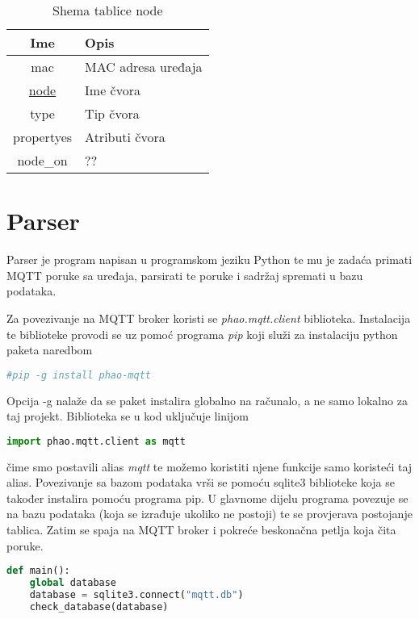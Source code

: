 \documentclass[times, utf8, zavrsni]{fer}
\begin{document}
{%

\begin{table}[H]
    \centering
    \begin{tabular}{ |c|l| }
        \hline
        Ime & Opis\\
        \hline
        mac & MAC adresa uređaja\\
        \hline
        \underline{node} & Ime čvora\\
        \hline
        type & Tip čvora\\
        \hline
        propertyes & Atributi čvora\\
        \hline
        node\_on & ??\\
        \hline
    \end{tabular}
    \caption{Shema tablice node}\label{tab:node_table}
\end{table}

\section{Parser}
Parser je program napisan u programskom jeziku Python te mu je zadaća primati MQTT poruke sa uređaja, parsirati te poruke i sadržaj spremati u bazu podataka.

Za povezivanje na MQTT broker koristi se \textit{phao.mqtt.client} biblioteka.
Instalacija te biblioteke provodi se uz pomoć programa \textit{pip} koji služi za instalaciju python paketa naredbom
\begin{lstlisting}[language=Bash]
    #pip -g install phao-mqtt
\end{lstlisting}
Opcija -g nalaže da se paket instalira globalno na računalo, a ne samo lokalno za taj projekt.
Biblioteka se u kod uključuje linijom
\begin{lstlisting}[language=Python]
    import phao.mqtt.client as mqtt
\end{lstlisting}
čime smo postavili alias \textit{mqtt} te možemo koristiti njene funkcije samo koristeći taj alias.
Povezivanje sa bazom podataka vrši se pomoću sqlite3 biblioteke koja se također instalira pomoću programa pip.
U glavnome dijelu programa povezuje se na bazu podataka (koja se izrađuje ukoliko ne postoji) te se provjerava postojanje tablica.
Zatim se spaja na MQTT broker i pokreće beskonačna petlja koja čita poruke.
\begin{lstlisting}[language=Python, caption=Main funkcija programskog koda]
def main():
    global database
    database = sqlite3.connect("mqtt.db")
    check_database(database)


\end{lstlisting}}
\end{document}

